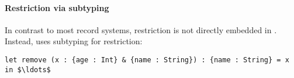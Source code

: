 \begin{comment}
\paragraph{Record terms and types}
Our system directly encodes a term for the single record construct $\recordCon l e$, where $l$ is some
label and $e$ is some other term.
This term comes with its associated type, denoted as $\recordType l T$, where $T$ is a type that is attributed 
to $e$. 

\paragraph{Selection}
The select operator is directly embedded in our language. 
It follows the usual syntax of $e.l$, where $e$ is an expression of type $\recordType l \alpha$ and 
$l$ is a label.
A polymorphic function which extracts any record that include the label $l$ of type
$\alpha$ could be written as:

\begin{lstlisting}[mathescape=true]
let select A (r : {l : A}) : A = r.l in $\ldots$ 
\end{lstlisting}

Note how, through the use of subtyping, this function will accept any intersection type that 
contains the single record $\recordType l A$.
This may resemble other systems with subtyping \cite{cardelli1990operations,pierce1994simple}, 
although it is slightly more general -- the type $A$ is not restricted only  
restricted to record types. 
\end{comment}

\paragraph{Restriction via subtyping}
In contrast to most record systems, restriction is not directly
embedded in \name.
Instead, \name uses subtyping for restriction: 
%
\begin{lstlisting}[mathescape=true]
let remove (x : {age : Int} & {name : String}) : {name : String} = x in $\ldots$ 
\end{lstlisting}

